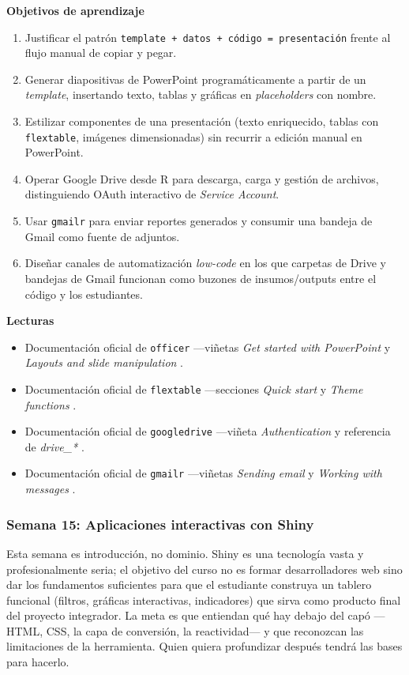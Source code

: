 \documentclass[11pt,letterpaper]{article}
\newcommand{\blue}[1]{{\color{cerulean}#1}}
\newcommand{\semana}[2]{%
  \subsubsection*{\color{main}Semana #1: #2}%
}
\begin{document}
\medskip
\noindent\textbf{Objetivos de aprendizaje}
\begin{enumerate}[leftmargin=*, itemsep=1pt]
    \item Justificar el patrón \texttt{template + datos + código = presentación} frente al flujo manual de copiar y pegar.
    \item Generar diapositivas de PowerPoint programáticamente a partir de un \textit{template}, insertando texto, tablas y gráficas en \textit{placeholders} con nombre.
    \item Estilizar componentes de una presentación (texto enriquecido, tablas con \texttt{flextable}, imágenes dimensionadas) sin recurrir a edición manual en PowerPoint.
    \item Operar Google Drive desde R para descarga, carga y gestión de archivos, distinguiendo OAuth interactivo de \textit{Service Account}.
    \item Usar \texttt{gmailr} para enviar reportes generados y consumir una bandeja de Gmail como fuente de adjuntos.
    \item Diseñar canales de automatización \textit{low-code} en los que carpetas de Drive y bandejas de Gmail funcionan como buzones de insumos/outputs entre el código y los estudiantes.
\end{enumerate}

\medskip
\noindent\textbf{Lecturas}
\begin{itemize}[leftmargin=*, itemsep=1pt]
    \item Documentación oficial de \texttt{officer} ---viñetas \textit{Get started with PowerPoint} y \textit{Layouts and slide manipulation} \cite{gohel-officer}.
    \item Documentación oficial de \texttt{flextable} ---secciones \textit{Quick start} y \textit{Theme functions} \cite{gohel-flextable}.
    \item Documentación oficial de \texttt{googledrive} ---viñeta \textit{Authentication} y referencia de \textit{drive\_*} \cite{bryan-googledrive}.
    \item Documentación oficial de \texttt{gmailr} ---viñetas \textit{Sending email} y \textit{Working with messages} \cite{hester-gmailr}.
\end{itemize}

\semana{15}{Aplicaciones interactivas con Shiny}

Esta semana es introducción, no dominio. Shiny es una tecnología vasta y profesionalmente seria; el objetivo del curso no es formar desarrolladores web sino \blue{dar los fundamentos suficientes para que el estudiante construya un tablero funcional} (filtros, gráficas interactivas, indicadores) que sirva como producto final del proyecto integrador. La meta es que entiendan qué hay debajo del capó ---HTML, CSS, la capa de conversión, la reactividad--- y que reconozcan las limitaciones de la herramienta. Quien quiera profundizar después tendrá las bases para hacerlo.
\end{document}
